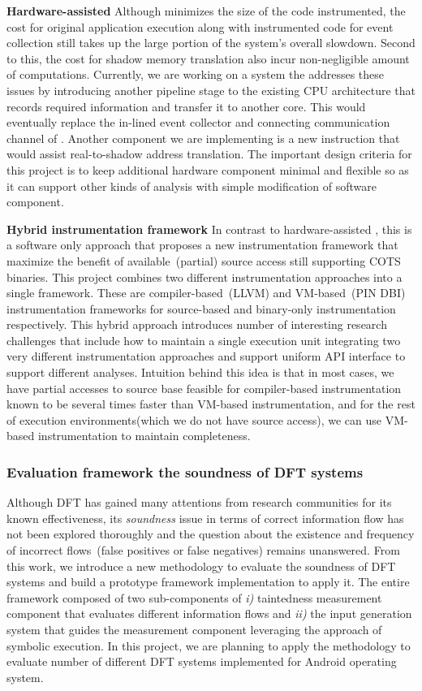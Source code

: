 \documentclass[letterpaper, 10pt]{article}
\begin{document}
\begin{small}
{\bf Hardware-assisted \SR} Although \SR minimizes the size of the code
instrumented, the cost for original application execution along with
instrumented code for event collection still takes up the large portion of the
system's overall slowdown. Second to this, the cost for shadow memory
translation also incur non-negligible amount of computations.
%
Currently, we are working on a system the addresses these issues by introducing
another pipeline stage to the existing CPU architecture that records required
information and transfer it to another core. This would eventually replace the
in-lined event collector and connecting communication channel of \SR. Another
component we are implementing is a new instruction that would assist
real-to-shadow address translation. The important design criteria for this
project is to keep additional hardware component minimal and flexible so as it
can support other kinds of analysis with simple modification of software
component.

{\bf Hybrid instrumentation framework} In contrast to hardware-assisted \SR,
this is a software only approach that proposes a new instrumentation framework
that maximize the benefit of available~(partial) source access still supporting
COTS binaries.
%
This project combines two different instrumentation approaches into a single
framework. These are compiler-based~(LLVM) and VM-based~(PIN DBI)
instrumentation frameworks for source-based and binary-only instrumentation
respectively.
%
This hybrid approach introduces number of interesting research challenges that
include how to maintain a single execution unit integrating two very different
instrumentation approaches and support uniform API interface to support
different analyses.
%
Intuition behind this idea is that in most cases, we have partial accesses to
source base feasible for compiler-based instrumentation known to be several
times faster than VM-based instrumentation, and for the rest of execution
environments(which we do not have source access), we can use VM-based
instrumentation to maintain completeness.

\subsubsection*{Evaluation framework the soundness of DFT systems}
%
Although DFT has gained many attentions from research communities for its known
effectiveness, its {\it soundness} issue in terms of correct information flow
has not been explored thoroughly and the question about the existence and
frequency of incorrect flows~(false positives or false negatives) remains
unanswered. From this work, we introduce a new methodology to evaluate the
soundness of DFT systems and build a prototype framework implementation to
apply it.
%
The entire framework composed of two sub-components of {\it i)} taintedness
measurement component that evaluates different information flows and {\it ii)}
the input generation system that guides the measurement component leveraging
the approach of symbolic execution.
%
In this project, we are planning to apply the methodology to evaluate number of
different DFT systems implemented for Android operating system.


\end{small}
\end{document}
